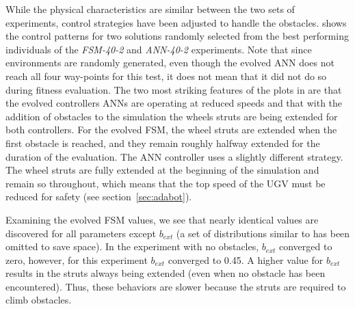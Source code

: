 While the physical characteristics are similar between the two sets of experiments, control strategies have been adjusted to handle the obstacles.
%
 shows the control patterns for two solutions randomly selected from the best performing individuals of the \emph{FSM-40-2} and \emph{ANN-40-2} experiments.
%
Note that since environments are randomly generated, even though the evolved ANN does not reach all four way-points for this test, it does not mean that it did not do so during fitness evaluation.
%
The two most striking features of the plots in  are that the evolved controllers ANNs are operating at reduced speeds and that with the addition of obstacles to the simulation the wheels struts are being extended for both controllers.
%
For the evolved FSM, the wheel struts are extended when the first obstacle is reached, and they remain roughly halfway extended for the duration of the evaluation.
%
The ANN controller uses a slightly different strategy. The wheel struts are fully extended at the beginning of the simulation and remain so throughout, which means that the top speed of the UGV must be reduced for safety (see section~\ref{sec:adabot}).



%
Examining the evolved FSM values, we see that nearly identical values are discovered for all parameters except $b_{\mathit{ext}}$
(a set of distributions similar to  has been omitted to save space).
%
In the experiment with no obstacles, $b_{\mathit{ext}}$ converged to zero, however, for this experiment $b_{\mathit{ext}}$ converged to 0.45.
%
A higher value for $b_{\mathit{ext}}$ results in the struts always being extended (even when no obstacle has been encountered).
%
Thus, these behaviors are slower because the struts are required to climb obstacles.

%




